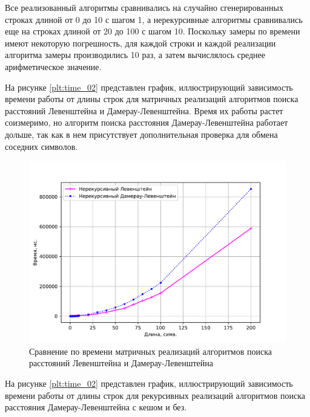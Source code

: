 Все реализованный алгоритмы сравнивались на случайно сгенерированных строках длиной от 0 до 10 с шагом 1, а нерекурсивные алгоритмы сравнивались еще на строках длиной от 20 до 100 с шагом 10. Поскольку замеры по времени имеют некоторую погрешность, для каждой строки и каждой реализации алгоритма замеры производились 10 раз, а затем вычислялось среднее арифметическое значение.

На рисунке \ref{plt:time_02} представлен график, иллюстрирующий зависимость времени работы от длины строк для матричных реализаций алгоритмов поиска расстояний Левенштейна и Дамерау-Левенштейна. Время их работы растет соизмеримо, но алгоритм поиска расстояния Дамерау-Левенштейна работает дольше, так как в нем присутствует дополнительная проверка для обмена соседних символов.

\begin{figure}[h]
	\centering
	\includegraphics[height=0.5\textheight, page=1]{img/figures.pdf}
	\caption{Сравнение по времени матричных реализаций алгоритмов поиска расстояний Левенштейна и Дамерау-Левенштейна}
	\label{plt:time_01}
\end{figure}

На рисунке \ref{plt:time_02} представлен график, иллюстрирующий зависимость времени работы от длины строк для рекурсивных реализаций алгоритмов поиска расстояния Дамерау-Левенштейна с кешом и без.

